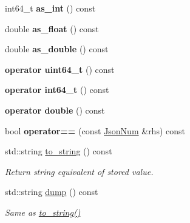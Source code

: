 \begin{DoxyCompactItemize}
\mbox{\label{classnta_1_1utils_1_1JsonNum_a0467c186ef4b7e9e72f703e1cd165737}} 
int64\+\_\+t {\bfseries as\+\_\+int} () const
\item 
\mbox{\label{classnta_1_1utils_1_1JsonNum_a5ca1010f8bfd27569f5cb2ddabacded7}} 
double {\bfseries as\+\_\+float} () const
\item 
\mbox{\label{classnta_1_1utils_1_1JsonNum_a7853ed40074bf81aa5cc0d139df753aa}} 
double {\bfseries as\+\_\+double} () const
\item 
\mbox{\label{classnta_1_1utils_1_1JsonNum_a01eada48d909adc6edef2dbe75809b9e}} 
{\bfseries operator uint64\+\_\+t} () const
\item 
\mbox{\label{classnta_1_1utils_1_1JsonNum_a5d31c8dcc19bf7d03c83b547b922806f}} 
{\bfseries operator int64\+\_\+t} () const
\item 
\mbox{\label{classnta_1_1utils_1_1JsonNum_ac71592324ce19e5c2da0d2b130243bab}} 
{\bfseries operator double} () const
\item 
\mbox{\label{classnta_1_1utils_1_1JsonNum_afd53b30172e0414c7ca735d7d4118877}} 
bool {\bfseries operator==} (const \hyperlink{classnta_1_1utils_1_1JsonNum}{Json\+Num} \&rhs) const
\item 
\mbox{\label{classnta_1_1utils_1_1JsonNum_a7038acc17c49e0162d6462dc0591a82d}} 
std\+::string \hyperlink{classnta_1_1utils_1_1JsonNum_a7038acc17c49e0162d6462dc0591a82d}{to\+\_\+string} () const
\begin{DoxyCompactList}\small\item\em Return string equivalent of stored value. \end{DoxyCompactList}\item 
\mbox{\label{classnta_1_1utils_1_1JsonNum_a304a9adefcdf875554ef0bd04225594a}} 
std\+::string \hyperlink{classnta_1_1utils_1_1JsonNum_a304a9adefcdf875554ef0bd04225594a}{dump} () const
\begin{DoxyCompactList}\small\item\em Same as \hyperlink{classnta_1_1utils_1_1JsonNum_a7038acc17c49e0162d6462dc0591a82d}{to\+\_\+string()} \end{DoxyCompactList}\end{DoxyCompactItemize}
